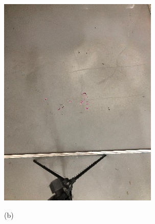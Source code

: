 \begin{figure}[!htbp]
\begin{minipage}{0.3\linewidth}
                \centerline{\includegraphics[width=\textwidth]{FIG/fig9(b).png}}
                \centerline{(b)}
              \end{minipage}\\
              \begin{minipage}{0.3\linewidth}
                \centering

\end{minipage}
\end{figure}
